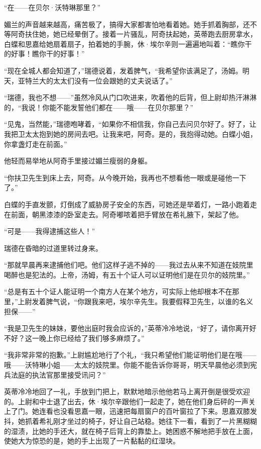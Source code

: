 \par “在——在贝尔·沃特琳那里？”
\par 媚兰的声音越来越高，痛苦极了，搞得大家都害怕地看着她。她手抓着胸部，还不等阿奇扶住她，她已经晕倒了。接着一片骚乱，阿奇扶起她，英蒂跑去厨房拿水，白蝶和思嘉给她扇着扇子，拍着她的手腕，休·埃尔辛则一遍遍地叫着：“瞧你干的好事！瞧你干的好事！”
\par “现在全城人都会知道了，”瑞德说着，发着脾气，“我希望你该满足了，汤姆。明天，亚特兰大的太太们没有一位会跟她的丈夫说话了。”
\par “瑞德，我也不想——”虽然冷风从门口吹进来，吹着他的后背，但上尉却热汗淋淋的，“我说！你能不能发誓他们都在——哦——在贝尔那里？”
\par “见鬼，当然能，”瑞德咆哮着，“如果你不相信我，你自己去问贝尔好了。好了，让我把卫太太抱到她的房间去吧。让我来吧，阿奇。是的，我抱得动她。白蝶小姐，你拿盏灯走在前面。”
\par 他轻而易举地从阿奇手里接过媚兰瘦弱的身躯。
\par “你扶卫先生到床上去，阿奇。从今晚开始，我再也不想看他一眼或是碰他一下了。”
\par 白蝶的手直发颤，灯倒成了威胁房子安全的东西，可她还是举着灯，一路小跑着走在前面，朝黑漆漆的卧室走去。阿奇嘟哝着把手臂放在希礼腋下，架起了他。
\par “可是——我得逮捕这些人！”
\par 瑞德在昏暗的过道里转过身来。
\par “那就早晨再来逮捕他们吧。他们这样子逃不掉的——我过去从来不知道在妓院里喝醉也是犯法的。上帝，汤姆，有五十个证人可以证明他们是在贝尔的妓院里。”
\par “总是有五十个证人能证明一个南方人在某个地方，可实际上他却根本不在那里，”上尉发着脾气说，“你跟我来吧，埃尔辛先生。我要假释卫先生，以谁的名义担保——”
\par “我是卫先生的妹妹，要他出庭时我会应诉的，”英蒂冷冷地说，“好了，请你离开好不好？这一晚上你已经给了我们够多麻烦了。”
\par “我非常非常的抱歉。”上尉尴尬地行了个礼，“我只希望他们能证明他们是在哦——哦——沃特琳小姐——太太的妓院里。你能不能告诉你哥哥，明天早晨他必须到宪兵法庭的执法官那里接受讯问？”
\par 英蒂冷冷地回了一礼，手放到门把上，默默地暗示他他若马上离开倒是很受欢迎的。上尉和中士退了出去，休·埃尔辛跟他们一起走了，她在他们身后砰的一声关上了门。她连看也没看思嘉一眼，迅速把每扇窗户的百叶窗拉了下来。思嘉双膝发抖，她抓着希礼刚才坐过的椅子，好让自己站稳。她往下一看，看到了一片黑糊糊的湿渍，比她的手还大，就在椅子后背上的靠垫上。她困惑不解地把手放在上面，使她大为惊恐的是，她的手上出现了一片黏黏的红湿块。
